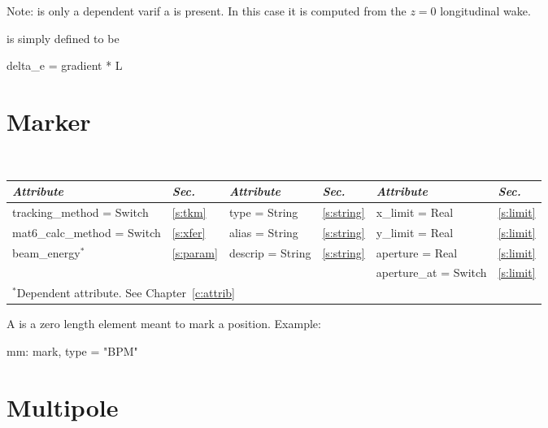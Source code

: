 {{Note:   is only a dependent varif a  is present. In this case
it is computed from the $z = 0$ longitudinal wake. 

 is simply defined to be
\begin{example}
  delta_e = gradient * L
\end{example}


\section{Marker}
\label{s:mark}

\begin{center}
\tt
\begin{tabular}{|l|l||l|l||l|l|} \hline
  {\sl Attribute} & {\sl Sec.}  & {\sl Attribute} & {\sl Sec.} & {\sl Attribute} & {\sl Sec.} \\ \hline
  tracking\_method = Switch    & \ref{s:tkm}  &  type = String      & \ref{s:string} & x\_limit = Real       & \ref{s:limit} \\ \hline 
  mat6\_calc\_method = Switch  & \ref{s:xfer} &  alias = String     & \ref{s:string} & y\_limit = Real       & \ref{s:limit} \\ \hline 
  beam\_energy$^*$             & \ref{s:param}&  descrip = String   & \ref{s:string} & aperture = Real       & \ref{s:limit} \\ \hline 
                               &              &                     &                & aperture\_at = Switch & \ref{s:limit} \\ \hline
  \multicolumn{6}{l}{\small $^*$Dependent attribute. See Chapter~\ref{c:attrib}} \\
\end{tabular}
\end{center}
\toffset

A  is a zero length element meant to mark a position.
Example:
\begin{example}
  mm: mark, type = "BPM"
\end{example}

\section{Multipole}
\label{s:mult}

}}
